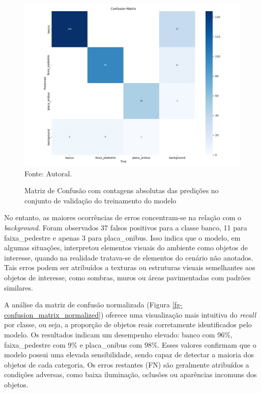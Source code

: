 \begin{figure}[htbp]
  \centering
  \caption{Matriz de Confusão com contagens absolutas das predições no conjunto de validação do treinamento do modelo}
  \includegraphics[width=1\textwidth]{Figuras/confusion_matrix.png}
  \\
  Fonte: Autoral.
  \label{fg-confusion_matrix}
\end{figure}

No entanto, as maiores ocorrências de erros concentram-se na relação com o \textit{background}. Foram observados 37 falsos positivos para a classe banco, 11 para faixa\_pedestre e apenas 3 para placa\_onibus. Isso indica que o modelo, em algumas situações, interpretou elementos visuais do ambiente como objetos de interesse, quando na realidade tratava-se de elementos do cenário não anotados. Tais erros podem ser atribuídos a texturas ou estruturas visuais semelhantes aos objetos de interesse, como sombras, muros ou áreas pavimentadas com padrões similares.

A análise da matriz de confusão normalizada (Figura \ref{fg-confusion_matrix_normalized}) oferece uma visualização mais intuitiva do \textit{recall} por classe, ou seja, a proporção de objetos reais corretamente identificados pelo modelo. Os resultados indicam um desempenho elevado: banco com 96\%, faixa\_pedestre com 9\% e placa\_onibus com 98\%. Esses valores confirmam que o modelo possui uma elevada sensibilidade, sendo capaz de detectar a maioria dos objetos de cada categoria. Os erros restantes (FN) são geralmente atribuídos a condições adversas, como baixa iluminação, oclusões ou aparências incomuns dos objetos.

